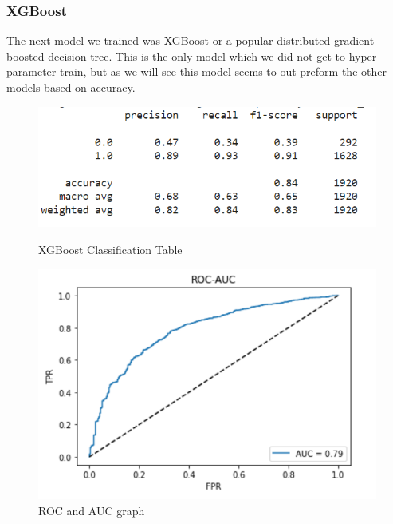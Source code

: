 \documentclass[12pt]{article}
\begin{document}
\subsubsection{XGBoost}

\noindent The next model we trained was XGBoost or a popular distributed gradient-boosted decision tree. This is the only model which we did not get to hyper parameter train, but as we will see this model seems to out preform the other models based on accuracy.
\begin{figure}[H]
    \centering
    \begin{minipage}[b]{0.5\textwidth}
        \includegraphics[scale = .45]{figures/XGBTable.png}
        \caption{XGBoost Classification Table}
    \end{minipage}
    \hfill
    \begin{minipage}[b]{0.4\textwidth}
        \includegraphics[scale = .30]{figures/XGB_roc.png}
        \caption{ROC and AUC graph}
    \end{minipage}
\end{figure}
\end{document}
